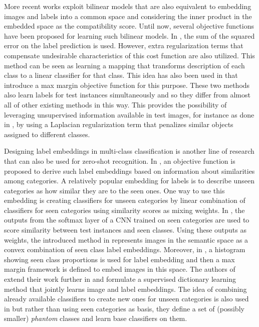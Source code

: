 \documentclass[10pt,twocolumn,letterpaper]{article}
\begin{document}
More recent works exploit bilinear models \cite{Yu2013, devise, convex, sse, emb15,semi15} that are also equivalent to embedding images and labels into a
common space and considering the inner product in the embedded space as the compatibility score.
Until now, several objective functions have been proposed for learning such bilinear models.
In \cite{emb15}, the sum of the squared error on the label prediction is used.
However, extra regularization terms that compensate undesirable characteristics of this cost function are also utilized.
This method can be seen as learning a mapping that transforms description of each class to a linear classifier for that class.
This idea has also been used in \cite{li15max, semi15} that introduce a max margin objective function for this purpose.
 These two methods also learn labels for test instances simultaneously and so they differ from almost all of other existing methods in this way. This provides the possibility of
leveraging unsupervised information available in test images, for instance as done in \cite{semi15}, by using a Laplacian regularization term that penalizes similar objects assigned to different classes.

Designing label embeddings in multi-class classification
is another line of research that can also be used for zero-shot recognition.
 In \cite{Yu2013}, an objective function is proposed to derive such label embeddings based on information about similarities among categories.
A relatively popular embedding for labels is to describe unseen categories as how similar they are to the seen ones.
One way to use this embedding is creating classifiers for unseen categories by linear combination of
classifiers for seen categories using similarity scores as mixing weights.
In \cite{convex}, the outputs from the softmax layer of a CNN trained on seen categories are used to score similarity between test instances and seen classes.
Using these outputs as weights, the introduced method in \cite{convex} represents images in the semantic space as a convex combination of seen class label embeddings.
Moreover, in \cite{sse}, a histogram showing seen class proportions is used for label embedding and then a max margin framework is defined to embed images in this space. The authors of \cite{convex} extend their work further in \cite{agnostic} and formulate a supervised dictionary learning method that jointly learns image and label embeddings.
 The idea of combining already available classifiers to create new ones for unseen categories is also used in \cite{Synthesized}
 but rather than using seen categories as basis, they define a set of (possibly smaller) \textit{phantom} classes and learn base classifiers on them.
\end{document}
